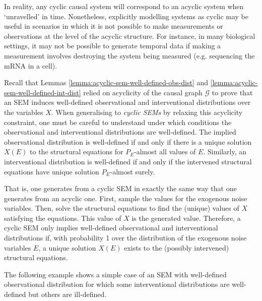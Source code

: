 In reality, any cyclic causal system will correspond to an acyclic system when `unravelled' in time.
Nonetheless, explicitly modelling systems as cyclic may be useful in scenarios in which it is not possible to make measurements or observations at the level of the acyclic structure.
For instance, in many biological settings, it may not be possible to generate temporal data if making a measurement involves destroying the system being measured (e.g. sequencing the mRNA in a cell).

Recall that Lemmas \ref{lemma:acyclic-sem-well-defined-obs-dist} and \ref{lemma:acyclic-sem-well-defined-int-dist} relied on acyclicity of the causal graph $\mathcal{G}$ to prove that an SEM induces well-defined observational and interventional distributions over the variables $X$. 
When generalising to \emph{cyclic SEMs} by relaxing this acyclicity constraint, one must be careful to understand under which conditions the observational and interventional distributions are well-defined.
The implied observational distribution is well-defined if and only if there is a unique solution $X(E)$ to the structural equations for $P_E$-almost all values of $E$. Similarly, an interventional distribution is well-defined if and only if the intervened structural equations have unique solution $P_E$-almost surely.

That is, one generates from a cyclic SEM in exactly the same way that one generates from an acyclic one. 
First, sample the values for the exogenous noise variables. 
Then, solve the structural equations to find the (unique) values of $X$ satisfying the equations. 
This value of $X$ is the generated value. 
Therefore, a cyclic SEM only implies well-defined observational and interventional distributions if, with probability 1 over the distribution of the exogenous noise variables $E$, a unique solution $X(E)$ exists to the (possibly intervened) structural equations.

The following example shows a simple case of an SEM with well-defined observational distribution for which some interventional distributions are well-defined but others are ill-defined.

\medskip

